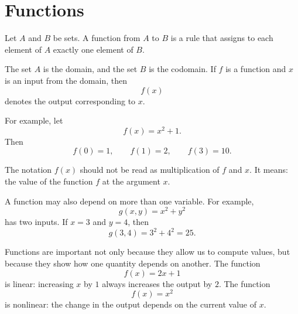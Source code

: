 \section{Functions}

\begin{definitionbox}
Let \(A\) and \(B\) be sets. A function from \(A\) to \(B\) is a rule that assigns to each element of \(A\) exactly one element of \(B\).
\end{definitionbox}

The set \(A\) is the domain, and the set \(B\) is the codomain. If \(f\) is a function and \(x\) is an input from the domain, then
\[
f(x)
\]
denotes the output corresponding to \(x\).

For example, let
\[
f(x)=x^2+1.
\]
Then
\[
f(0)=1, \qquad f(1)=2, \qquad f(3)=10.
\]

\begin{remarkbox}
The notation \(f(x)\) should not be read as multiplication of \(f\) and \(x\). It means: the value of the function \(f\) at the argument \(x\).
\end{remarkbox}

A function may also depend on more than one variable. For example,
\[
g(x,y)=x^2+y^2
\]
has two inputs. If \(x=3\) and \(y=4\), then
\[
g(3,4)=3^2+4^2=25.
\]

Functions are important not only because they allow us to compute values, but because they show how one quantity depends on another. The function
\[
f(x)=2x+1
\]
is linear: increasing \(x\) by \(1\) always increases the output by \(2\). The function
\[
f(x)=x^2
\]
is nonlinear: the change in the output depends on the current value of \(x\).
